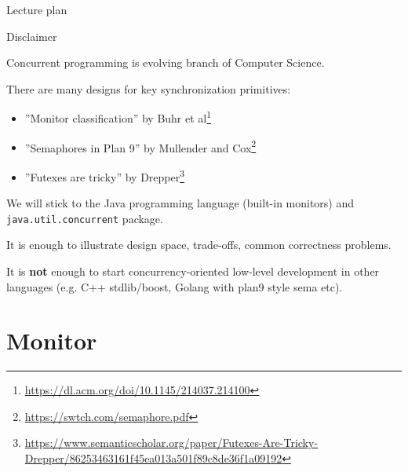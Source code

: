 \begin{frame}{Lecture plan}
\tableofcontents
\end{frame}

\begin{frame}[t]{Disclaimer}

Concurrent programming is evolving branch of Computer Science.

\pause

There are many designs for key synchronization primitives:

\begin{itemize}
    \item ''Monitor classification'' by Buhr et al\footnote<2->{\tiny\url{https://dl.acm.org/doi/10.1145/214037.214100}}
    \item ''Semaphores in Plan 9'' by Mullender and Cox\footnote<2->{\tiny\url{https://swtch.com/semaphore.pdf}}
    \item ''Futexes are tricky'' by Drepper\footnote<2->{\tiny\url{https://www.semanticscholar.org/paper/Futexes-Are-Tricky-Drepper/86253463161f45ea013a501f89c8de36f1a09192}}
\end{itemize}

\pause
We will stick to the Java programming language (built-in monitors) and \texttt{java.util.concurrent} package.

\pause
It is enough to illustrate design space, trade-offs, common correctness problems.

\pause
It is \textbf{not} enough to start concurrency-oriented low-level development in other languages (e.g. C++ stdlib/boost, Golang with plan9 style sema etc).

\end{frame}

\section{Monitor}
\showTOC


